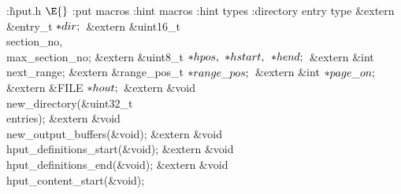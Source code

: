 \Y\B\4:\.{hput.h }\X${}\E{}$\6
:put macros\X\6
:hint macros\X\6
:hint types\X\6
:directory entry type\X\7
\&{extern} \&{entry\_t} ${}{*}\index{dir+\\{dir}}\\{dir};{}$\6
\&{extern} \&{uint16\_t} \\{section\_no}${},{}$ \\{max\_section\_no};\6
\&{extern} \&{uint8\_t} ${}{*}\index{hpos+\\{hpos}}\\{hpos},{}$ ${}{*}\index{hstart+\\{hstart}}\\{hstart},{}$ ${}{*}\index{hend+\\{hend}}\\{hend};{}$\6
\&{extern} \&{int} \\{next\_range};\6
\&{extern} \&{range\_pos\_t} ${}{*}\index{range pos+\\{range\_pos}}\\{range\_pos};{}$\6
\&{extern} \&{int} ${}{*}\index{page on+\\{page\_on}}\\{page\_on};{}$\6
\&{extern} \&{FILE} ${}{*}\index{hout+\\{hout}}\\{hout};{}$\6
\&{extern} \&{void} \\{new\_directory}(\&{uint32\_t} \\{entries});\6
\&{extern} \&{void} \\{new\_output\_buffers}(\&{void});\6
\&{extern} \&{void} \\{hput\_definitions\_start}(\&{void});\6
\&{extern} \&{void} \\{hput\_definitions\_end}(\&{void});\6
\&{extern} \&{void} \\{hput\_content\_start}(\&{void});\6
